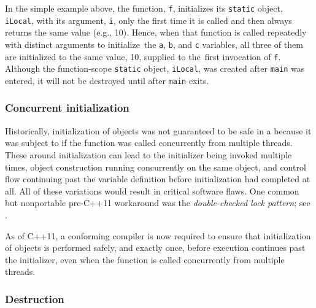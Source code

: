 \noindent In the simple example above, the function, \lstinline!f!, initializes its
\lstinline!static! object, \lstinline!iLocal!, with its argument, \lstinline!i!, only
the first time it is called and then always returns the same value
(e.g., 10). Hence, when that function is called repeatedly with distinct
arguments to initialize~the \lstinline!a!, \lstinline!b!, and
\lstinline!c! variables, all three of them are initialized to the same
value, 10, supplied to the~first invocation of \lstinline!f!. Although the function-scope \lstinline!static!
object, \lstinline!iLocal!, was created after \lstinline!main! was entered, it
will not be destroyed until after \lstinline!main! exits.

\subsubsection[Concurrent initialization]{Concurrent initialization}\label{concurrent-initialization}

Historically, initialization of 
 objects was not guaranteed to be safe in a
 because it was subject to 
if the function was called concurrently from multiple threads.   These 
around initialization can lead to the initializer being invoked multiple times, object
construction running concurrently on the same object, and control flow continuing past
the variable definition before initialization had completed at all.  All of these
variations would result in critical software flaws.
One common but nonportable pre-C++11 workaround was the
\emph{double-checked lock pattern}; see .

As of C++11, a conforming compiler is now required to ensure that
initialization of  
objects is performed safely, and exactly once, before execution continues past the initializer, even when the function is called
concurrently from multiple threads.

\subsubsection[Destruction]{Destruction}\label{destruction}

